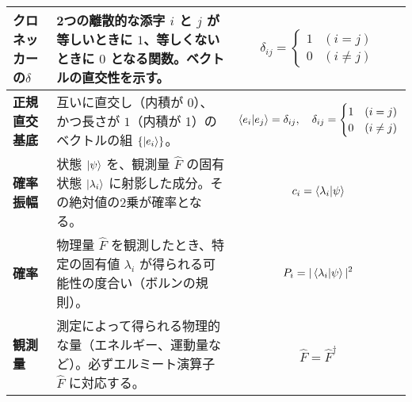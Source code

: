 \documentclass{ltjsarticle}
\begin{document}
\begin{longtable}{| >{\bfseries}l | p{6cm} | p{6cm} |}
クロネッカーの$\delta$ & 2つの離散的な添字 $i$ と $j$ が等しいときに $1$、等しくないときに $0$ となる関数。ベクトルの直交性を示す。 & $$\delta_{ij} = \begin{cases} 1 & (i=j) \\ 0 & (i \ne j) \end{cases}$$ \\
\hline
正規直交基底 & 互いに直交し（内積が 0）、かつ長さが $1$（内積が 1）のベクトルの組 $\{ \ket{e_i} \}$。 & $$\braket{e_i|e_j} = \delta_{ij}, \quad \delta_{ij} = \begin{cases} 1 & (i=j) \\ 0 & (i \ne j) \end{cases}$$ \\
\hline
確率振幅 & 状態 $\ket{\psi}$ を、観測量 $\hat{F}$ の固有状態 $\ket{\lambda_i}$ に射影した成分。その絶対値の2乗が確率となる。 & $$c_i = \braket{\lambda_i|\psi}$$ \\
\hline
確率 & 物理量 $\hat{F}$ を観測したとき、特定の固有値 $\lambda_i$ が得られる可能性の度合い（ボルンの規則）。 & $$P_i = |\braket{\lambda_i|\psi}|^2$$ \\
\hline
観測量 & 測定によって得られる物理的な量（エネルギー、運動量など）。必ずエルミート演算子 $\hat{F}$ に対応する。 & $$\hat{F} = \hat{F}^\dagger$$ \\
\hline
\end{longtable}
\end{document}
